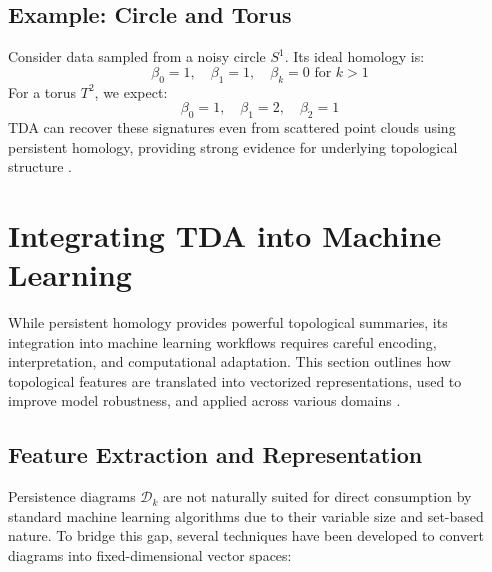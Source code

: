 \documentclass[9pt, twoside, twocolumn]{extarticle}
\begin{document}
    \subsection*{Example: Circle and Torus}

        Consider data sampled from a noisy circle $S^1$. Its ideal homology is:
        \[
        \beta_0 = 1, \quad \beta_1 = 1, \quad \beta_k = 0 \text{ for } k > 1
        \]
        For a torus $T^2$, we expect:
        \[
        \beta_0 = 1, \quad \beta_1 = 2, \quad \beta_2 = 1
        \]
        TDA can recover these signatures even from scattered point clouds using persistent homology, providing strong evidence for underlying topological structure \cite{carlsson2009topology, rieck2020tda}.

\section*{Integrating TDA into Machine Learning}

    While persistent homology provides powerful topological summaries, its integration into machine learning workflows requires careful encoding, interpretation, and computational adaptation. This section outlines how topological features are translated into vectorized representations, used to improve model robustness, and applied across various domains \cite{hofer2017deep, rieck2020tda}.

    \subsection*{Feature Extraction and Representation}

        Persistence diagrams $\mathcal{D}_k$ are not naturally suited for direct consumption by standard machine learning algorithms due to their variable size and set-based nature. To bridge this gap, several techniques have been developed to convert diagrams into fixed-dimensional vector spaces:
\end{document}
